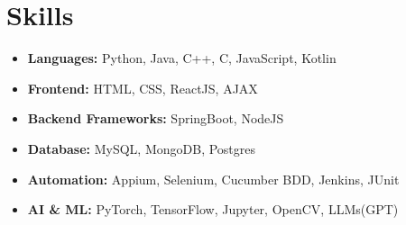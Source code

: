 \documentclass[letterpaper,11pt]{article}
\newcommand{\resumeItem}[1]{
  \item\small{
    {#1 \vspace{-2pt}}
  }
}
\newcommand{\resumeSubHeadingListStart}{\begin{itemize}[leftmargin=0.15in, label={}]}
\newcommand{\resumeSubHeadingListEnd}{\end{itemize}}
\begin{document}
\section{\textbf{Skills}}

\resumeSubHeadingListStart
\resumeItem{\textbf{Languages:} Python, Java, C++, C, JavaScript, Kotlin}
\vspace{-7pt}
\resumeItem{\textbf{Frontend:} HTML, CSS, ReactJS, AJAX}
\vspace{-7pt}
\resumeItem{\textbf{Backend Frameworks:} SpringBoot, NodeJS}

\vspace{-7pt}
\resumeItem{\textbf{Database:} MySQL, MongoDB, Postgres}
\vspace{-7pt}
\resumeItem{\textbf{Automation:} Appium, Selenium, Cucumber BDD, Jenkins, JUnit}
\vspace{-7pt}

\resumeItem{\textbf{AI \& ML:} PyTorch, TensorFlow, Jupyter, OpenCV, LLMs(GPT) }
\vspace{-7pt}


\resumeSubHeadingListEnd

\vspace{-10pt}
\end{document}
